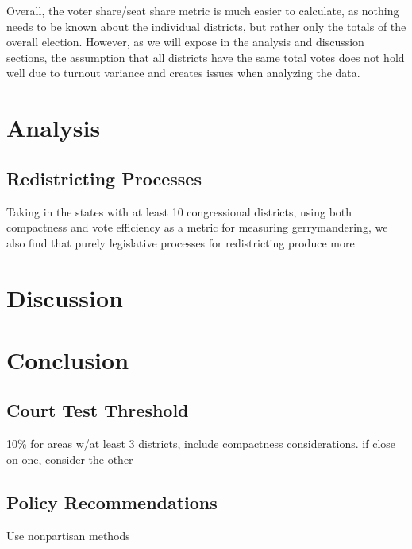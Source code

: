 \documentclass[12pt]{article}
\begin{document}
  Overall, the voter share/seat share metric is much easier to calculate, as nothing needs to be known about the individual districts, but rather only the totals of the overall election.  However, as we will expose in the analysis and discussion sections, the assumption that all districts have the same total votes does not hold well due to turnout variance and creates issues when analyzing the data.\\
  

  \section{Analysis}
  
 \subsection{Redistricting Processes}
Taking in the states with at least 10 congressional districts, using both compactness and vote efficiency as a metric for measuring gerrymandering, we also find that purely legislative processes for redistricting produce more  
  \section{Discussion}

  \section{Conclusion}
  
  \subsection{Court Test Threshold}
  10\% for areas w/at least 3 districts, include compactness considerations.  if close on one, consider the other
  \subsection{Policy Recommendations}
  Use nonpartisan methods
  
  \singlespacing{}

  \printbibliography{}
\end{document}
